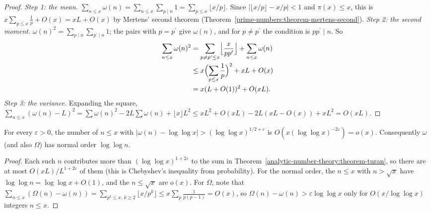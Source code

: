 \begin{proof}
\emph{Step 1: the mean.} $\sum_{n \leq x}\omega(n) = \sum_{n \leq x}\sum_{p \mid n}1 = \sum_{p \leq x}\lfloor x/p\rfloor$. Since $|\lfloor x/p\rfloor - x/p| < 1$ and $\pi(x) \leq x$, this is
$x\sum_{p \leq x}\frac1p + O(x) = xL + O(x)$ by Mertens' second theorem (Theorem~\ref{prime-numbers:theorem-mertens-second}).
\emph{Step 2: the second moment.} $\omega(n)^2 = \sum_{p \mid n}\sum_{p^{\prime} \mid n}1$; the pairs with $p = p^{\prime}$ give $\omega(n)$, and for $p \neq p^{\prime}$ the condition is $pp^{\prime} \mid n$. So
\[
\begin{aligned}
\sum_{n \leq x}\omega(n)^2 &= \sum_{p \neq p^{\prime} \leq x}\Bigl\lfloor\frac{x}{pp^{\prime}}\Bigr\rfloor + \sum_{n \leq x}\omega(n) \\
&\leq x\Bigl(\sum_{p \leq x}\frac1p\Bigr)^2 + xL + O(x) \\
&= x(L + O(1))^2 + O(xL).
\end{aligned}
\]
\emph{Step 3: the variance.} Expanding the square,
$\sum_{n \leq x}(\omega(n) - L)^2 = \sum\omega(n)^2 - 2L\sum\omega(n) + \lfloor x\rfloor L^2 \leq xL^2 + O(xL) - 2L(xL - O(x)) + xL^2 = O(xL)$.
\end{proof}

\begin{corollary}\label{analytic-number-theory:corollary-hardy-ramanujan}
For every $\varepsilon > 0$, the number of $n \leq x$ with $|\omega(n) - \log\log x| > (\log\log x)^{1/2 + \varepsilon}$ is $O(x(\log\log x)^{-2\varepsilon}) = o(x)$. Consequently $\omega$ (and also
$\Omega$) has normal order $\log\log n$.
\end{corollary}

\begin{proof}
Each such $n$ contributes more than $(\log\log x)^{1 + 2\varepsilon}$ to the sum in Theorem~\ref{analytic-number-theory:theorem-turan}, so there are at most $O(xL)/L^{1 + 2\varepsilon}$ of them
(this is Chebyshev's inequality from probability). For the normal order, the $n \leq x$ with $n > \sqrt{x}$ have $\log\log n = \log\log x + O(1)$, and the $n \leq \sqrt{x}$ are $o(x)$. For $\Omega$, note that
$\sum_{n \leq x}(\Omega(n) - \omega(n)) = \sum_{p^k \leq x,\, k \geq 2}\lfloor x/p^k\rfloor \leq x\sum_p\frac{1}{p(p - 1)} = O(x)$, so $\Omega(n) - \omega(n) > \varepsilon\log\log x$ only for
$O(x/\log\log x)$ integers $n \leq x$.
\end{proof}

